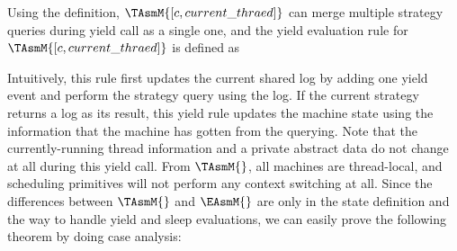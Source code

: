 Using the definition, $\TAsmM{[c, current\_thraed]}$ can merge multiple strategy queries during yield call as a single one, 
and the yield evaluation rule for $\TAsmM{[c, current\_thraed]}$ is defined as
\begin{small}
\begin{mathpar}
\end{mathpar}
\end{small}%
Intuitively, this rule first updates the current shared log by adding one yield event 
and perform the strategy query using the log.
If the current strategy returns a log as its result,
this yield rule updates the machine state using
the information that the machine has gotten from the querying. 
Note that the currently-running thread information and a private abstract data do not change at all 
during this yield call. 
From $\TAsmM{}$, all machines are thread-local, 
and scheduling primitives will not perform any context switching at all. 
Since the differences between $\TAsmM{}$ and $\EAsmM{}$ are only in the state definition 
and the way to handle yield and sleep evaluations, 
we can easily prove the following theorem by doing case analysis:

